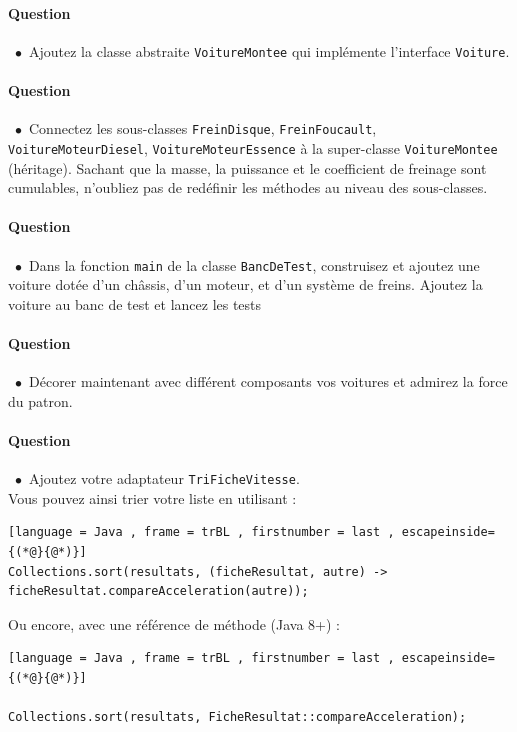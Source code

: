 \documentclass[a4paper,11pt]{exam}
\newcommand{\point}{$\bullet$\ }
\begin{document}
\paragraph*{\textsf{Question \thequestion}}\ 
\point Ajoutez la classe abstraite {\tt VoitureMontee} qui implémente l'interface {\tt Voiture}. 

\paragraph*{\textsf{Question \thequestion}}\ 
\point Connectez les sous-classes {\tt FreinDisque}, {\tt FreinFoucault}, {\tt VoitureMoteurDiesel}, {\tt VoitureMoteurEssence} à la super-classe {\tt VoitureMontee} (héritage).
Sachant que la masse, la puissance et le coefficient de freinage sont cumulables, n'oubliez pas de redéfinir les méthodes au niveau des sous-classes.

\stepcounter{question} 
\paragraph*{\textsf{Question \thequestion}}\ 
\point Dans la fonction {\tt main}  de la classe {\tt BancDeTest}, construisez et ajoutez une voiture dotée d'un châssis, d'un moteur, et d'un système de freins.
Ajoutez la voiture au banc de test et lancez les tests

\paragraph*{\textsf{Question \thequestion}}\ 
\point Décorer maintenant avec différent composants vos voitures et admirez la force du patron.

\stepcounter{question} 
\paragraph*{\textsf{Question \thequestion}}\ 
\point Ajoutez votre adaptateur {\tt TriFicheVitesse}.\\


Vous pouvez ainsi trier votre liste en utilisant :

\begin{lstlisting}[language = Java , frame = trBL , firstnumber = last , escapeinside={(*@}{@*)}]
Collections.sort(resultats, (ficheResultat, autre) -> ficheResultat.compareAcceleration(autre));

\end{lstlisting}

Ou encore, avec une référence de méthode (Java 8+) :

\begin{lstlisting}[language = Java , frame = trBL , firstnumber = last , escapeinside={(*@}{@*)}]

Collections.sort(resultats, FicheResultat::compareAcceleration);

\end{lstlisting}
\end{document}

